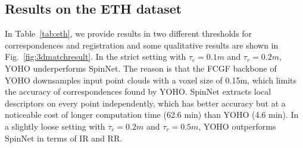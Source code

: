 \begin{table}[]
\begin{center}
\end{center}
\caption{RR on the ETH dataset with ICP. T is the total time for the registration, including the time used in ICP.}
\label{tab:ethicp}
\vspace{-20pt}
\end{table}


\subsection{Results on the ETH dataset}
\label{sec:maineth}

In Table~\ref{tab:eth}, we provide results in two different thresholds for correspondences and registration and some qualitative results are shown in Fig.~\ref{fig:3dmatchresult}. In the strict setting with $\tau_c=0.1m$ and $\tau_r=0.2m$, YOHO underperforms SpinNet. The reason is that the FCGF backbone of YOHO downsamples input point clouds with a voxel size of 0.15m, which limits the accuracy of correspondences found by YOHO. SpinNet extracts local descriptors on every point independently, which has better accuracy but at a noticeable cost of longer computation time (62.6 min) than YOHO (4.6 min). In a slightly loose setting with $\tau_c=0.2m$ and $\tau_r=0.5m$, YOHO outperforms SpinNet in terms of IR and RR. 

